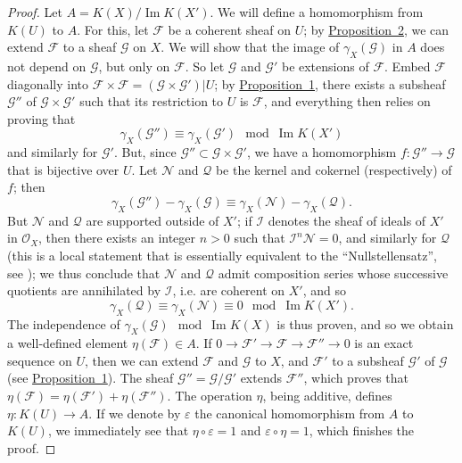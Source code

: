 \documentclass{article}
\theoremstyle{plain}
\theoremstyle{definition}
\newcommand{\scr}[1]{{\mathscr{#1}}}
\newcommand{\oldpage}[1]{\marginpar{\footnotesize$\Big\vert$ \textit{p.~#1}}}
\begin{document}
\begin{proof}
  Let $A=K(X)/\operatorname{Im} K(X')$.
  We will define a homomorphism from $K(U)$ to $A$.
  For this, let $\scr{F}$ be a coherent sheaf on $U$;
  by \hyperref[proposition2]{Proposition~2}, we can extend $\scr{F}$ to a sheaf $\scr{G}$ on $X$.
  We will show that the image of $\gamma_X(\scr{G})$ in $A$ does not depend on $\scr{G}$, but only on $\scr{F}$.
  So let $\scr{G}$ and $\scr{G}'$ be extensions of $\scr{F}$.
  Embed $\scr{F}$ diagonally into $\scr{F}\times\scr{F}=(\scr{G}\times\scr{G}')|U$;
  by \hyperref[proposition1]{Proposition~1}, there exists a subsheaf $\scr{G}''$ of $\scr{G}\times\scr{G}'$ such that its restriction to $U$ is $\scr{F}$, and everything then relies on proving that
  \[
    \gamma_X(\scr{G}'') \equiv \gamma_X(\scr{G}') \mod \operatorname{Im}K(X')
  \]
  and similarly for $\scr{G}'$.
  But, since $\scr{G}''\subset\scr{G}\times\scr{G}'$, we have a homomorphism $f\colon\scr{G}''\to\scr{G}$ that is bijective over $U$.
  Let $\scr{N}$ and $\scr{Q}$ be the kernel and cokernel (respectively) of $f$;
  then
  \[
    \gamma_X(\scr{G}'') - \gamma_X(\scr{G})
    \equiv \gamma_X(\scr{N}) - \gamma_X(\scr{Q}).
  \]
  But $\scr{N}$ and $\scr{Q}$ are supported outside of $X'$;
  if $\scr{I}$ denotes the sheaf
\oldpage{116}
  of ideals of $X'$ in $\scr{O}_X$, then there exists an integer $n>0$ such that $\scr{I}^n\scr{N}=0$, and similarly for $\scr{Q}$ (this is a local statement that is essentially equivalent to the ``Nullstellensatz'', see \cite{14});
  we thus conclude that $\scr{N}$ and $\scr{Q}$ admit composition series whose successive quotients are annihilated by $\scr{I}$, i.e. are coherent on $X'$, and so
  \[
    \gamma_X(\scr{Q}) \equiv \gamma_X(\scr{N}) \equiv 0 \mod \operatorname{Im}K(X').
  \]
  The independence of $\gamma_X(\scr{G}) \mod\operatorname{Im}K(X)$ is thus proven, and so we obtain a well-defined element $\eta(\scr{F})\in A$.
  If $0\to\scr{F}'\to\scr{F}\to\scr{F}''\to0$ is an exact sequence on $U$, then we can extend $\scr{F}$ and $\scr{G}$ to $X$, and $\scr{F}'$ to a subsheaf $\scr{G}'$ of $\scr{G}$ (see \hyperref[proposition1]{Proposition~1}).
  The sheaf $\scr{G}''=\scr{G}/\scr{G}'$ extends $\scr{F}''$, which proves that $\eta(\scr{F})=\eta(\scr{F}')+\eta(\scr{F}'')$.
  The operation $\eta$, being additive, defines $\eta\colon K(U)\to A$.
  If we denote by $\varepsilon$ the canonical homomorphism from $A$ to $K(U)$, we immediately see that $\eta\circ\varepsilon=1$ and $\varepsilon\circ\eta=1$, which finishes the proof.
\end{proof}
\end{document}
